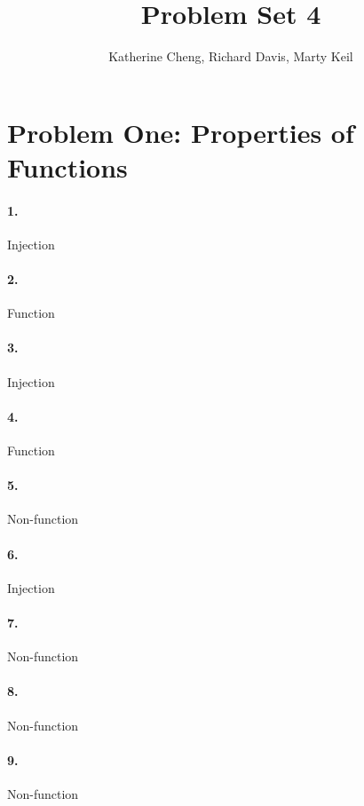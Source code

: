 \documentclass[10pt,letter]{article}
\begin{document}

\title{Problem Set 4}

\author{Katherine Cheng, Richard Davis, Marty Keil}

 
\maketitle 

\section*{Problem One: Properties of Functions}

\paragraph{1.} Injection
\paragraph{2.} Function
\paragraph{3.} Injection
\paragraph{4.} Function
\paragraph{5.} Non-function
\paragraph{6.} Injection
\paragraph{7.} Non-function
\paragraph{8.} Non-function
\paragraph{9.} Non-function
\end{document}
